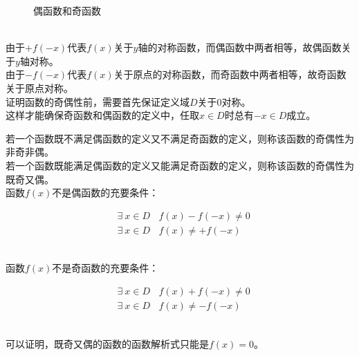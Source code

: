 \documentclass[UTF8]{ctexart}
\begin{document}
\begin{figure}[h]
\begin{center}
{
            }
            \caption{偶函数和奇函数}
        \end{center}
    \end{figure}\\
    由于$+f(-x)$代表$f(x)$关于$y$轴的对称函数，而偶函数中两者相等，故偶函数关于$y$轴对称。\\[3mm]
    由于$-f(-x)$代表$f(x)$关于原点的对称函数，而奇函数中两者相等，故奇函数关于原点对称。\\[3mm]
    证明函数的奇偶性前，需要首先保证定义域$D$关于$0$对称。\\[3mm]
    这样才能确保奇函数和偶函数的定义中，任取$x\in D$时总有$-x\in D$成立。

\newpage

    若一个函数既不满足偶函数的定义又不满足奇函数的定义，则称该函数的奇偶性为非奇非偶。\\[3mm]
    若一个函数既能满足偶函数的定义又能满足奇函数的定义，则称该函数的奇偶性为既奇又偶。\\[3mm]    
    函数$f(x)$不是偶函数的充要条件：
    \begin{large}
        \begin{align*}
            &\exists~x\in D~~~~f(x)-f(-x)\neq 0\\[3mm]
            &\exists~x\in D~~~~f(x)\neq+f(-x)
        \end{align*}
    \end{large}\\
    函数$f(x)$不是奇函数的充要条件：
    \begin{large}
        \begin{align*}
            &\exists~x\in D~~~~f(x)+f(-x)\neq 0\\[3mm]
            &\exists~x\in D~~~~f(x)\neq-f(-x)
        \end{align*}
    \end{large}\\
    可以证明，既奇又偶的函数的函数解析式只能是$f(x)=0$。\vspace{5pt}
\end{document}
